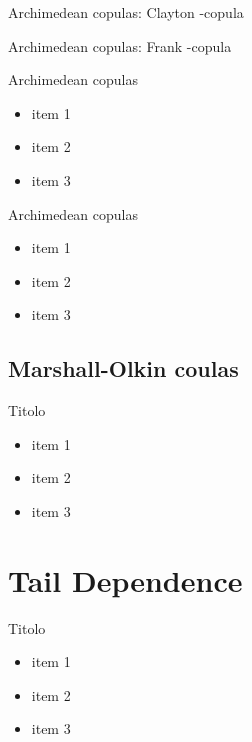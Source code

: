 \documentclass[11pt]{beamer}
\theoremstyle{plain}
\theoremstyle{definition}
\theoremstyle{remark}
\begin{document}
%
\begin{frame}{Archimedean copulas: Clayton -copula}
 
 
 \end{frame}
%
\begin{frame}{Archimedean copulas: Frank -copula}

\end{frame}
%
\begin{frame}{Archimedean copulas}
   \begin{itemize}
      \item   				  						  
		item 1 
	  \item item 2
\item item 3
   \end{itemize}
\end{frame}
%
\begin{frame}{Archimedean copulas}
   \begin{itemize}
      \item   				  						  
		item 1 
	  \item item 2
\item item 3
   \end{itemize}
\end{frame}
\subsection{Marshall-Olkin coulas}
%
\begin{frame}{Titolo}
   \begin{itemize}
      \item   				  						  
		item 1 
	  \item item 2
\item item 3
   \end{itemize}
\end{frame}
\section{Tail Dependence}
%
\begin{frame}{Titolo}
   \begin{itemize}
      \item   				  						  
		item 1 
	  \item item 2
\item item 3
   \end{itemize}
\end{frame}
\end{document}
